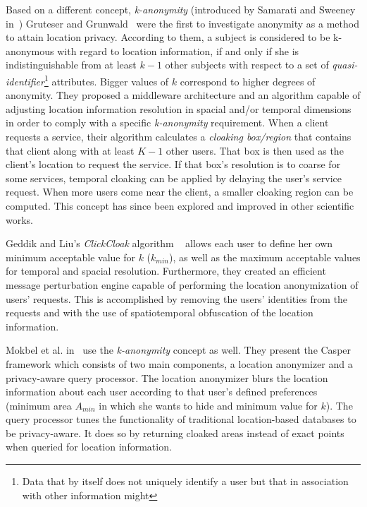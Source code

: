 Based on a different concept, \emph{k-anonymity} (introduced by
Samarati and Sweeney in~\cite{samarati1998protecting}) Gruteser and
Grunwald~\cite{gruteser2003anonymous} were the first to investigate
anonymity as a method to attain location privacy. According to them, a
subject is considered to be k-anonymous with regard to location
information, if and only if she is indistinguishable from at least
$k-1$ other subjects with respect to a set of
\emph{quasi-identifier}\footnote{Data that by itself does not uniquely
 identify a user but that in association with other
 information might}
attributes. Bigger values of $k$ correspond to higher degrees of
anonymity. They proposed a middleware architecture and an algorithm
capable of adjusting location information resolution in spacial and/or
temporal dimensions in order to comply with a specific
\emph{k-anonymity} requirement. When a client requests a service,
their algorithm calculates a \emph{cloaking box/region} that contains
that client along with at least $K-1$ other users. That box is then
used as the client's location to request the service. If that box's
resolution is to coarse for some services, temporal cloaking can be
applied by delaying the user's service request. When more users come
near the client, a smaller cloaking region can be computed. This concept
has since been explored and improved in other scientific works.

Geddik and Liu's
\emph{ClickCloak} algorithm
~\cite{gedik2005location,gedik2008protecting} allows each user to
define her own minimum acceptable value for $k$ ($k_{min}$), as well
as the maximum acceptable values for temporal and spacial resolution.
Furthermore, they created an efficient message perturbation engine
capable of performing the location anonymization of users' requests.
This is accomplished by removing the users' identities from the
requests and with the use of spatiotemporal obfuscation of the
location information. 

Mokbel et al. in~\cite{mokbel2006new} use the \emph{k-anonymity} concept as well.
They present the Casper framework which consists of two main
components, a location anonymizer and a privacy-aware query processor.
The location anonymizer blurs the location information about each user
according to that user's defined preferences (minimum area $A_{min}$
in which she wants to hide and minimum value for $k$). The query
processor tunes the functionality of traditional location-based
databases to be privacy-aware. It does so by returning cloaked areas
instead of exact points when queried for location information.

